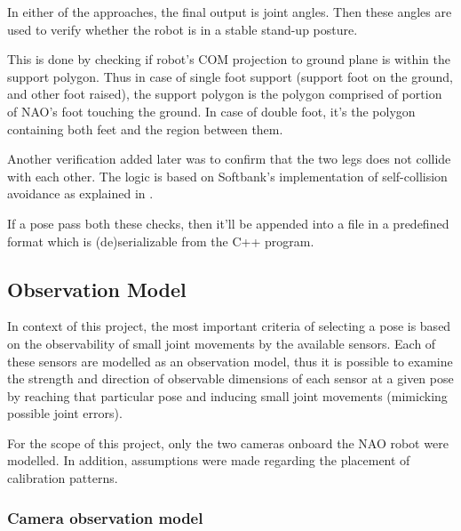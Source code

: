 \documentclass[english, printversion, nomenclature, notitle]{tuvisionthesis} %
\begin{document}
In either of the approaches, the final output is joint angles. Then these angles are used to verify whether the robot is in a stable stand-up posture.

This is done by checking if robot's COM projection to ground plane is within the support polygon. Thus in case of single foot support (support foot on the ground, and other foot raised), the support polygon is the polygon comprised of portion of NAO's foot touching the ground. In case of double foot, it's the polygon containing both feet and the region between them. 

Another verification added later was to confirm that the two legs does not collide with each other. The logic is based on Softbank's implementation of self-collision avoidance as explained in .

If a pose pass both these checks, then it'll be appended into a file in a predefined format which is (de)serializable from the C++ program. 

\subsection{Observation Model}
In context of this project, the most important criteria of selecting a pose is based on the observability of small joint movements by the available sensors. Each of these sensors are modelled as an observation model, thus it is possible to examine the strength and direction of observable dimensions of each sensor at a given pose by reaching that particular pose and inducing small joint movements (mimicking possible joint errors).

For the scope of this project, only the two cameras onboard the NAO robot were modelled. In addition, assumptions were made regarding the placement of calibration patterns.

\subsubsection{Camera observation model}
\end{document}
